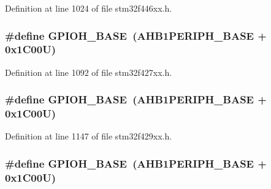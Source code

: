 Definition at line 1024 of file stm32f446xx.\+h.

\subsubsection[{\texorpdfstring{G\+P\+I\+O\+H\+\_\+\+B\+A\+SE}{GPIOH_BASE}}]{\setlength{\rightskip}{0pt plus 5cm}\#define G\+P\+I\+O\+H\+\_\+\+B\+A\+SE~({\bf A\+H\+B1\+P\+E\+R\+I\+P\+H\+\_\+\+B\+A\+SE} + 0x1\+C00\+U)}\hypertarget{group___peripheral__memory__map_gaee4716389f3a1c727495375b76645608}{}\label{group___peripheral__memory__map_gaee4716389f3a1c727495375b76645608}


Definition at line 1092 of file stm32f427xx.\+h.

\subsubsection[{\texorpdfstring{G\+P\+I\+O\+H\+\_\+\+B\+A\+SE}{GPIOH_BASE}}]{\setlength{\rightskip}{0pt plus 5cm}\#define G\+P\+I\+O\+H\+\_\+\+B\+A\+SE~({\bf A\+H\+B1\+P\+E\+R\+I\+P\+H\+\_\+\+B\+A\+SE} + 0x1\+C00\+U)}\hypertarget{group___peripheral__memory__map_gaee4716389f3a1c727495375b76645608}{}\label{group___peripheral__memory__map_gaee4716389f3a1c727495375b76645608}


Definition at line 1147 of file stm32f429xx.\+h.

\subsubsection[{\texorpdfstring{G\+P\+I\+O\+H\+\_\+\+B\+A\+SE}{GPIOH_BASE}}]{\setlength{\rightskip}{0pt plus 5cm}\#define G\+P\+I\+O\+H\+\_\+\+B\+A\+SE~({\bf A\+H\+B1\+P\+E\+R\+I\+P\+H\+\_\+\+B\+A\+SE} + 0x1\+C00\+U)}\hypertarget{group___peripheral__memory__map_gaee4716389f3a1c727495375b76645608}{}\label{group___peripheral__memory__map_gaee4716389f3a1c727495375b76645608}


